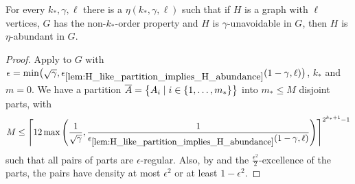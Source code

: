         \begin{theorem} \label{thm:property_testing_with_stable_partitions}
            For every $k_*, \gamma, \ell$ there is a $\eta(k_*, \gamma, \ell)$ such that if $H$ is a graph with $\ell$
            vertices, $G$ has the non-$k_*$-order property and $H$ is $\gamma$-unavoidable in $G$, then $H$ is
            $\eta$-abundant in $G$.
            \begin{proof}
                Apply  to $G$ with $\epsilon = \min \bigl( \sqrt{\gamma},
                    \epsilon_{\ref{lem:H_like_partition_implies_H_abundance}} ( 1 - \gamma, \ell ) \bigr)$,
                $k_*$ and $m=0$.
                We have a partition $\overline{A} = \bigl\{ A_i \mid i \in \{ 1, \dots, m_* \} \bigr\}$ into $m_* \leq M$
                disjoint parts, with
                \[
                    M \leq \left\lceil 12 \max\left( \frac{1}{\sqrt{\gamma}}, \frac{1}{\epsilon_{\ref{lem:H_like_partition_implies_H_abundance}}
                        ( 1 - \gamma, \ell )} \right) \right\rceil^{2^{k_*+1}-1}
                \]
                such that all pairs of parts are $\epsilon$-regular.
                Also, by  and the $\frac{\epsilon^2}{2}$-excellence of the parts,
                the pairs have density at most $\epsilon^2$ or at least $1 - \epsilon^2$.


\end{proof}
\end{theorem}
